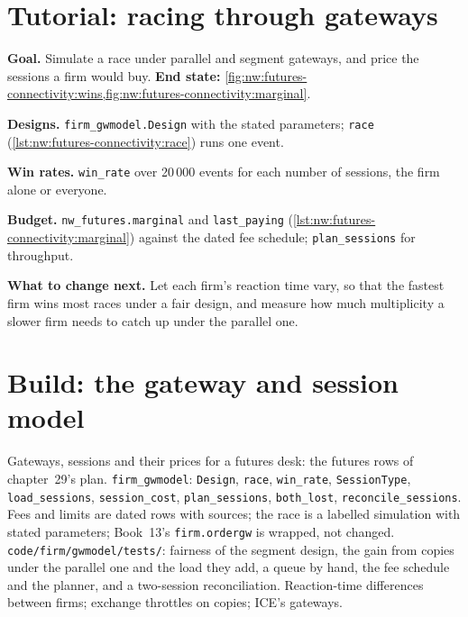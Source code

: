 \section{Tutorial: racing through gateways}\label{tut:nw:futures-connectivity:tut}

\begin{tutorial}
\textbf{Goal.} Simulate a race under parallel and segment gateways, and price the sessions a firm would buy.
\textbf{End state:} \cref{fig:nw:futures-connectivity:wins,fig:nw:futures-connectivity:marginal}.
\begin{tutsteps}
\item \textbf{Designs.} \texttt{firm\_gwmodel.Design} with the stated parameters; \texttt{race}
  (\cref{lst:nw:futures-connectivity:race}) runs one event.
\item \textbf{Win rates.} \texttt{win\_rate} over 20\,000 events for each number of sessions, the firm alone or everyone.
\item \textbf{Budget.} \texttt{nw\_futures.marginal} and \texttt{last\_paying} (\cref{lst:nw:futures-connectivity:marginal})
  against the dated fee schedule; \texttt{plan\_sessions} for throughput.
\end{tutsteps}
\textbf{What to change next.} Let each firm's reaction time vary, so that the fastest firm wins most races under a fair design, and
measure how much multiplicity a slower firm needs to catch up under the parallel one.
\end{tutorial}

\section{Build: the gateway and session model}\label{bld:nw:futures-connectivity:gwmodel}

\begin{build}
 Gateways, sessions and their prices for a futures desk: the futures rows of chapter~29's plan.
 \texttt{firm\_gwmodel}: \texttt{Design}, \texttt{race}, \texttt{win\_rate}, \texttt{SessionType},
\texttt{load\_sessions}, \texttt{session\_cost}, \texttt{plan\_sessions}, \texttt{both\_lost}, \texttt{reconcile\_sessions}.
 Fees and limits are dated rows with sources; the race is a labelled simulation with stated parameters; Book~13's
\texttt{firm.ordergw} is wrapped, not changed.
 \texttt{code/firm/gwmodel/tests/}: fairness of the segment design, the gain from copies under the parallel
one and the load they add, a queue by hand, the fee schedule and the planner, and a two-session reconciliation.
 Reaction-time differences between firms; exchange throttles on copies; ICE's gateways.
\end{build}

